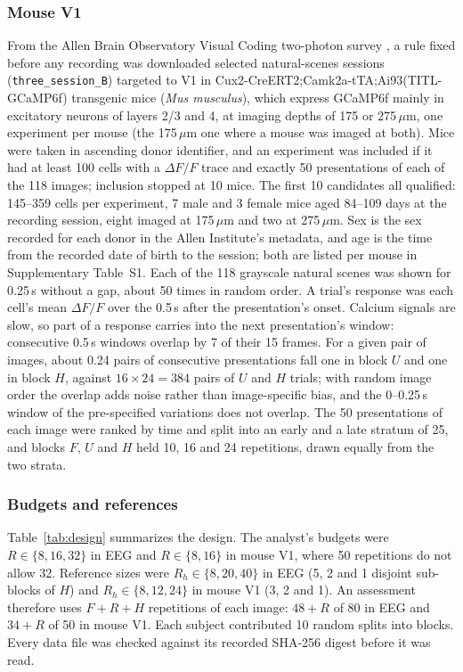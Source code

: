 \documentclass[11pt]{article}
\newcommand{\MouseCellsMin}{145}
\newcommand{\MouseCellsMax}{359}
\newcommand{\MouseMale}{7}
\newcommand{\MouseFemale}{3}
\newcommand{\MouseAgeMin}{84}
\newcommand{\MouseAgeMax}{109}
\newcommand{\OvPerPair}{0.24}
\begin{document}
\subsubsection{Mouse V1}\label{sec:data-mouse}
From the Allen Brain Observatory Visual Coding two-photon survey \citep{devries2020,allen2016data}, a rule fixed before any recording was downloaded selected natural-scenes sessions (\texttt{three\_session\_B}) targeted to V1 in Cux2-CreERT2;Camk2a-tTA;Ai93(TITL-GCaMP6f) transgenic mice (\emph{Mus musculus}), which express GCaMP6f mainly in excitatory neurons of layers 2/3 and 4, at imaging depths of 175 or 275\,$\mu$m, one experiment per mouse (the 175\,$\mu$m one where a mouse was imaged at both).
Mice were taken in ascending donor identifier, and an experiment was included if it had at least 100 cells with a $\Delta F/F$ trace and exactly 50 presentations of each of the 118 images; inclusion stopped at 10 mice.
The first 10 candidates all qualified: \MouseCellsMin--\MouseCellsMax{} cells per experiment, \MouseMale{} male and \MouseFemale{} female mice aged \MouseAgeMin--\MouseAgeMax{} days at the recording session, eight imaged at 175\,$\mu$m and two at 275\,$\mu$m.
Sex is the sex recorded for each donor in the Allen Institute's metadata, and age is the time from the recorded date of birth to the session; both are listed per mouse in Supplementary Table~S1.
Each of the 118 grayscale natural scenes was shown for 0.25\,s without a gap, about 50 times in random order.
A trial's response was each cell's mean $\Delta F/F$ over the 0.5\,s after the presentation's onset.
Calcium signals are slow, so part of a response carries into the next presentation's window: consecutive 0.5\,s windows overlap by 7 of their 15 frames.
For a given pair of images, about \OvPerPair{} pairs of consecutive presentations fall one in block $U$ and one in block $H$, against $16\times24=384$ pairs of $U$ and $H$ trials; with random image order the overlap adds noise rather than image-specific bias, and the 0--0.25\,s window of the pre-specified variations does not overlap.
The 50 presentations of each image were ranked by time and split into an early and a late stratum of 25, and blocks $F$, $U$ and $H$ held 10, 16 and 24 repetitions, drawn equally from the two strata.

\subsubsection{Budgets and references}
Table~\ref{tab:design} summarizes the design.
The analyst's budgets were $R\in\{8,16,32\}$ in EEG and $R\in\{8,16\}$ in mouse V1, where 50 repetitions do not allow 32.
Reference sizes were $R_h\in\{8,20,40\}$ in EEG (5, 2 and 1 disjoint sub-blocks of $H$) and $R_h\in\{8,12,24\}$ in mouse V1 (3, 2 and 1).
An assessment therefore uses $F+R+H$ repetitions of each image: $48+R$ of 80 in EEG and $34+R$ of 50 in mouse V1.
Each subject contributed 10 random splits into blocks.
Every data file was checked against its recorded SHA-256 digest before it was read.
\end{document}
